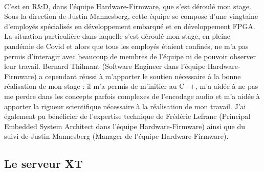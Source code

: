 \documentclass{article}
\begin{document}
    \paragraph{}
    C'est en R\&D, dans l'équipe Hardware-Firmware, que s'est déroulé mon stage. Sous la direction de Justin Mannesberg, cette équipe se compose d'une vingtaine d'employés spécialisés en développement embarqué et en développement FPGA. La situation particulière dans laquelle s'est déroulé mon stage, en pleine pandémie de Covid et alors que tous les employés étaient confinés, ne m'a pas permis d'interagir avec beaucoup de membres de l'équipe ni de pouvoir observer leur travail. Bernard Thilmant (Software Engineer dans l'équipe Hardware-Firmware) a cependant réussi à m'apporter le soutien nécessaire à la bonne réalisation de mon stage : il m'a permis de m'initier au C++, m'a aidée à ne pas me perdre dans les concepts parfois complexes de l'encodage audio et m'a aidée à apporter la rigueur scientifique nécessaire à la réalisation de mon travail. J'ai également pu bénéficier de l'expertise technique de Frédéric Lefranc (Principal Embedded System Architect dans l'équipe Hardware-Firmware) ainsi que du suivi de Justin Mannesberg (Manager de l'équipe Hardware-Firmware).

    \subsection{Le serveur XT}
\end{document}
